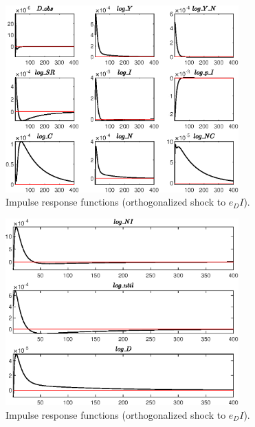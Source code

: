 \begin{figure}[H]
\centering 
\includegraphics[width=0.80\textwidth]{BRS_growth/graphs/BRS_growth_IRF_e_DI2}
\caption{Impulse response functions (orthogonalized shock to ${e_DI}$).}\label{Fig:IRF:e_DI:2}
\end{figure}
 
\begin{figure}[H]
\centering 
\includegraphics[width=0.80\textwidth]{BRS_growth/graphs/BRS_growth_IRF_e_DI3}
\caption{Impulse response functions (orthogonalized shock to ${e_DI}$).}\label{Fig:IRF:e_DI:3}
\end{figure}
 
